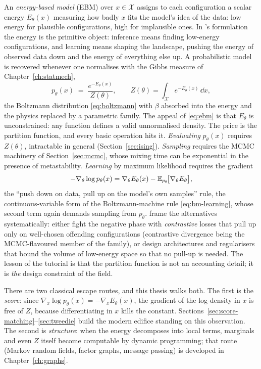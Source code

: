 An \emph{energy-based model} (EBM) over $x \in \mathcal{X}$ assigns to
each configuration a scalar energy $E_\theta(x)$ measuring how badly $x$
fits the model's idea of the data: low energy for plausible
configurations, high for implausible ones. In
\citeauthor{lecun2006tutorial}'s formulation the energy is the primitive
object: inference means finding low-energy configurations, and learning
means shaping the landscape, pushing the energy of observed data down and
the energy of everything else up. A probabilistic model is recovered
whenever one normalises with the Gibbs measure of
Chapter~\ref{ch:statmech},
\begin{equation}
  p_\theta(x) \;=\; \frac{e^{-E_\theta(x)}}{Z(\theta)},
  \qquad
  Z(\theta) = \int_{\mathcal{X}} e^{-E_\theta(x)}\, \dd x ,
  \label{eq:ebm}
\end{equation}
the Boltzmann distribution \eqref{eq:boltzmann} with $\beta$ absorbed
into the energy and the physics replaced by a parametric family. The
appeal of \eqref{eq:ebm} is that $E_\theta$ is unconstrained: any
function defines a valid unnormalised density. The price is the
partition function, and every basic operation hits it. \emph{Evaluating}
$p_\theta(x)$ requires $Z(\theta)$, intractable in general
(Section~\ref{sec:ising}). \emph{Sampling} requires the MCMC machinery of
Section~\ref{sec:mcmc}, whose mixing time can be exponential in the
presence of metastability. \emph{Learning} by maximum likelihood requires
the gradient
\begin{equation}
  -\nabla_\theta \log p_\theta(x)
  = \nabla_\theta E_\theta(x)
  - \mathbb{E}_{p_\theta}\!\big[ \nabla_\theta E_\theta \big],
  \label{eq:ebm-gradient}
\end{equation}
the ``push down on data, pull up on the model's own samples'' rule, the
continuous-variable form of the Boltzmann-machine rule
\eqref{eq:bm-learning}, whose second term again demands sampling from
$p_\theta$. \citet{lecun2006tutorial} frame the alternatives
systematically: either fight the negative phase with \emph{contrastive}
losses that pull up only on well-chosen offending configurations
(contrastive divergence \citep{hinton2002training} being the
MCMC-flavoured member of the family), or design architectures and
regularisers that bound the volume of low-energy space so that no pull-up
is needed. The lesson of the tutorial is that the partition function is
not an accounting detail; it is \emph{the} design constraint of the
field.

There are two classical escape routes, and this thesis walks both. The
first is the \emph{score}: since
$\nabla_x \log p_\theta(x) = -\nabla_x E_\theta(x)$, the gradient of the
log-density in $x$ is free of $Z$, because differentiating in $x$ kills
the constant. Sections~\ref{sec:score-matching}--\ref{sec:tweedie} build
the modern edifice standing on this observation. The second is
\emph{structure}: when the energy decomposes into local terms, marginals
and even $Z$ itself become computable by dynamic programming; that route
(Markov random fields, factor graphs, message passing) is developed in
Chapter~\ref{ch:graphs}.

